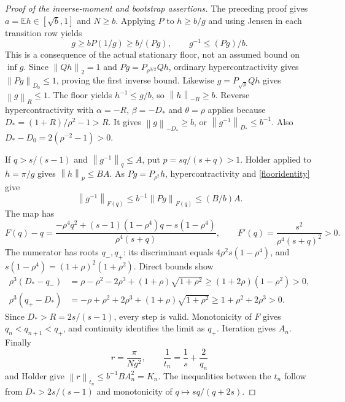 \documentclass[11pt]{article}
\newcommand{\E}{\mathbb E}
\newcommand{\norm}[1]{\left\|#1\right\|}
\begin{document}
\begin{proof}[Proof of the inverse-moment and bootstrap assertions]
The preceding proof gives $a=\E h\in[\sqrt b,1]$ and $N\geq b$. Applying $P$ to $h\geq b/g$ and using Jensen in each transition row yields
\begin{equation}\label{flooridentity}
 g\geq bP(1/g)\geq b/(Pg),\qquad g^{-1}\leq(Pg)/b.
\end{equation}
This is a consequence of the actual stationary floor, not an assumed bound on $\inf g$.
Since $\norm{Qh}_2=1$ and $Pg=P_{\rho^{3/2}}Qh$, ordinary hypercontractivity gives $\norm{Pg}_{D_0}\leq1$, proving the first inverse bound. Likewise $g=P_{\sqrt\rho}Qh$ gives $\norm g_R\leq1$. The floor yields $h^{-1}\leq g/b$, so $\norm h_{-R}\geq b$. Reverse hypercontractivity with $\alpha=-R$, $\beta=-D_*$ and $\theta=\rho$ applies because
$D_*=(1+R)/\rho^2-1>R$. It gives $\norm g_{-D_*}\geq b$, or $\norm{g^{-1}}_{D_*}\leq b^{-1}$. Also $D_*-D_0=2(\rho^{-2}-1)>0$.

If $q>s/(s-1)$ and $\norm{g^{-1}}_q\leq A$, put $p=sq/(s+q)>1$. Holder applied to $h=\pi/g$ gives $\norm h_p\leq BA$. As $Pg=P_{\rho^2}h$, hypercontractivity and \eqref{flooridentity} give
\[
 \norm{g^{-1}}_{F(q)}\leq b^{-1}\norm{Pg}_{F(q)}\leq (B/b)A.
\]
The map has
\[
 F(q)-q=\frac{-\rho^4q^2+(s-1)(1-\rho^4)q-s(1-\rho^4)}{\rho^4(s+q)},
 \qquad F'(q)=\frac{s^2}{\rho^4(s+q)^2}>0.
\]
The numerator has roots $q_-,q_+$: its discriminant equals
$4\rho^2s(1-\rho^4)$, and $s(1-\rho^4)=(1+\rho)^2(1+\rho^2)$. Direct bounds show
\begin{align*}
 \rho^3(D_*-q_-)&=\rho-\rho^2-2\rho^3+(1+\rho)\sqrt{1+\rho^2}
 \geq(1+2\rho)(1-\rho^2)>0,\\
 \rho^3(q_+-D_*)&=-\rho+\rho^2+2\rho^3+(1+\rho)\sqrt{1+\rho^2}
 \geq1+\rho^2+2\rho^3>0.
\end{align*}
Since $D_*>R=2s/(s-1)$, every step is valid. Monotonicity of $F$ gives
$q_n<q_{n+1}<q_+$, and continuity identifies the limit as $q_+$. Iteration gives $A_n$. Finally
\[
 r=\frac{\pi}{Ng^2},\qquad \frac1{t_n}=\frac1s+\frac2{q_n}
\]
and Holder give $\norm r_{t_n}\leq b^{-1}BA_n^2=K_n$. The inequalities between the $t_n$ follow from $D_*>2s/(s-1)$ and monotonicity of $q\mapsto sq/(q+2s)$.
\end{proof}
\end{document}
